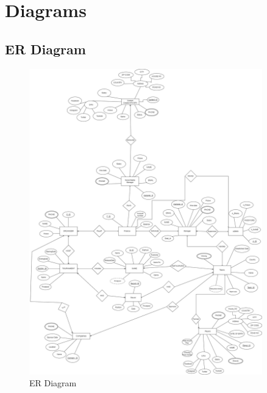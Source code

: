 \chapter{Diagrams}
\hrulefill


\section{ER Diagram}
\begin{figure}[h]
    \centering
    \includegraphics[width=0.9\textwidth]{diagrams/ER_ESPORTS_Diagram.png}
    \caption{ER Diagram}
    \label{fig:ER Diagram}
\end{figure}

\clearpage
